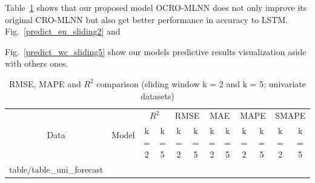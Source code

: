 \documentclass[review,3p,authoryear]{elsarticle}
\makeatletter
\newcommand\primitiveinput[1]
		{\@@input #1 }
\makeatother
\begin{document}
Table~\ref{table:uni_forecast} shows that our proposed model OCRO-MLNN does not only improve its original CRO-MLNN but also get better performance in accuracy to LSTM. Fig.~\ref{predict_eu_sliding2} and {Fig.~\ref{predict_wc_sliding5} show our models predictive results visualization aside with others ones.


\begin{table}[!h]
	\caption{RMSE, MAPE and $R^2$ comparison (sliding window k = 2 and k = 5; univariate datasets)}
	\label{table:uni_forecast}
	\centering
	\begin{adjustbox}{width=\textwidth}
		\begin{tabular}{| c | c | c | c | c | c | c | c | c | c | c | c |}%
			\hline
			\multirow{2}{*}{Data} & \multirow{2}{*}{Model} & \multicolumn{2}{c|}{$R^2$} & \multicolumn{2}{c|}{RMSE} & \multicolumn{2}{c|}{MAE} & \multicolumn{2}{c|}{MAPE}  & \multicolumn{2}{c|}{SMAPE} \\ \cline{3-12}
   				& & k = 2 & k = 5 & k = 2 & k = 5 & k = 2 & k = 5 & k = 2 & k = 5 & k = 2 & k = 5 \\ [0.5ex] 
			\hline
			\primitiveinput{table/table_uni_forecast}
			\hline
		\end{tabular}
	\end{adjustbox}
\end{table}






}
\end{document}
